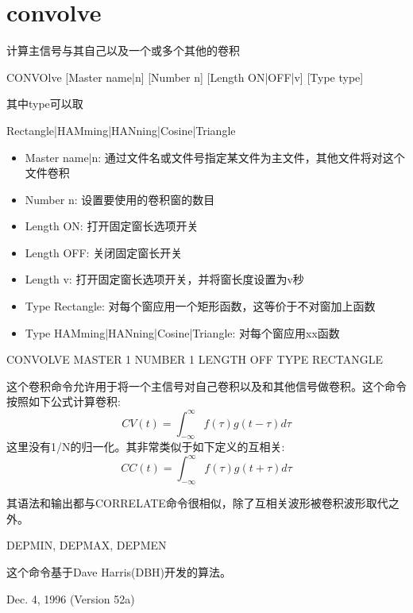 \section{convolve}
\label{cmd:convolve}

计算主信号与其自己以及一个或多个其他的卷积

CONVOlve [Master name|n] [Number n] [Length ON|OFF|v] [Type type]

其中type可以取

Rectangle|HAMming|HANning|Cosine|Triangle

\begin{itemize}
\item Master name|n: 通过文件名或文件号指定某文件为主文件，其他文件将对这个文件卷积
\item Number n: 设置要使用的卷积窗的数目
\item Length ON: 打开固定窗长选项开关
\item Length OFF: 关闭固定窗长开关
\item Length v: 打开固定窗长选项开关，并将窗长度设置为v秒
\item Type Rectangle: 对每个窗应用一个矩形函数，这等价于不对窗加上函数
\item Type HAMming|HANning|Cosine|Triangle: 对每个窗应用xx函数
\end{itemize}

CONVOLVE MASTER 1 NUMBER 1 LENGTH OFF TYPE RECTANGLE

这个卷积命令允许用于将一个主信号对自己卷积以及和其他信号做卷积。这个命令按照如下公式计算卷积:
	\[ CV(t) = \int_{-\infty} ^\infty f(\tau)g(t-\tau)d\tau \]
这里没有1/N的归一化。其非常类似于如下定义的互相关:
	\[ CC(t) = \int_{-\infty} ^\infty f(\tau)g(t+\tau)d\tau \]
	
其语法和输出都与CORRELATE命令很相似，除了互相关波形被卷积波形取代之外。

DEPMIN, DEPMAX, DEPMEN

这个命令基于Dave Harris(DBH)开发的算法。

Dec. 4, 1996 (Version 52a)
